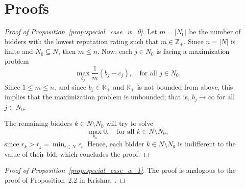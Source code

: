 \section{Proofs} %
\label{sec:proofs}
\begin{proof}[Proof of Proposition~\ref{prop:special_case_w_0}]
Let $m = |N_0|$ be the number of bidders with the lowest reputation rating such that $m\in\mathbb{Z}_+$. Since $n = |N|$ is finite and $N_0\subseteq N$, then $m \le n$. Now, each $j\in N_0$ is facing a maximization problem
\begin{equation*}
	\max_{b_j} \frac{1}{m} \left(b_j - c_j \right), \quad\text{for all } j\in N_0.
\end{equation*}
Since $1\le m\le n$, and since $b_j\in\mathbb{R}_+$ and $\mathbb{R}_+$ is not bounded from above, this implies that the maximization problem is unbounded; that is, $b_j\rightarrow\infty$ for all $j\in N_0$.

The remaining bidders $k\in N\setminus N_0$ will try to solve
\begin{equation*}
	\max_{b_k} 0, \quad\text{for all } k\in N\setminus N_0,
\end{equation*}
since $r_k > r_j = \min_{i\in N} r_i$. Hence, each bidder $k\in N\setminus N_0$ is indifferent to the value of their bid, which concludes the proof.
\end{proof}

\begin{proof}[Proof of Proposition~\ref{prop:special_case_w_1}]
The proof is analogous to the proof of Proposition~2.2 in Krishna~\cite{Krishna10}.
\end{proof}

